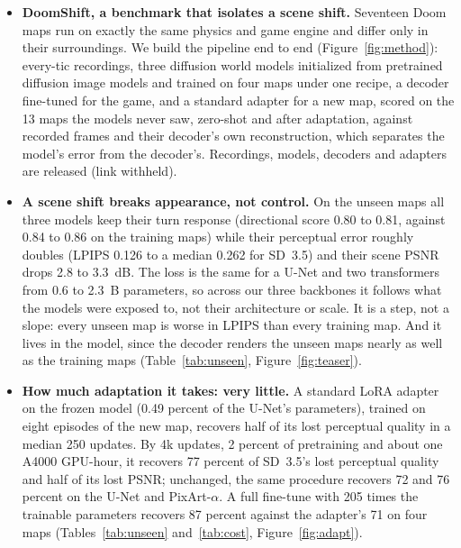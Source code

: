 \begin{itemize}\setlength{\itemsep}{0pt}
\item \textbf{DoomShift, a benchmark that isolates a scene shift.} Seventeen Doom maps run on exactly the same physics and game engine and differ only in their surroundings. We build the pipeline end to end (Figure~\ref{fig:method}): every-tic recordings, three diffusion world models initialized from pretrained diffusion image models and trained on four maps under one recipe, a decoder fine-tuned for the game, and a standard adapter for a new map, scored on the 13 maps the models never saw, zero-shot and after adaptation, against recorded frames and their decoder's own reconstruction, which separates the model's error from the decoder's. Recordings, models, decoders and adapters are released (link withheld).
\item \textbf{A scene shift breaks appearance, not control.} On the unseen maps all three models keep their turn response (directional score 0.80 to 0.81, against 0.84 to 0.86 on the training maps) while their perceptual error roughly doubles (LPIPS 0.126 to a median 0.262 for SD~3.5) and their scene PSNR drops 2.8 to 3.3~dB. The loss is the same for a U-Net and two transformers from 0.6 to 2.3~B parameters, so across our three backbones it follows what the models were exposed to, not their architecture or scale. It is a step, not a slope: every unseen map is worse in LPIPS than every training map. And it lives in the model, since the decoder renders the unseen maps nearly as well as the training maps (Table~\ref{tab:unseen}, Figure~\ref{fig:teaser}).
\item \textbf{How much adaptation it takes: very little.} A standard LoRA adapter on the frozen model (0.49 percent of the U-Net's parameters), trained on eight episodes of the new map, recovers half of its lost perceptual quality in a median 250 updates. By 4k updates, 2 percent of pretraining and about one A4000 GPU-hour, it recovers 77 percent of SD~3.5's lost perceptual quality and half of its lost PSNR; unchanged, the same procedure recovers 72 and 76 percent on the U-Net and PixArt-$\alpha$. A full fine-tune with 205 times the trainable parameters recovers 87 percent against the adapter's 71 on four maps (Tables~\ref{tab:unseen} and~\ref{tab:cost}, Figure~\ref{fig:adapt}).
\end{itemize}
